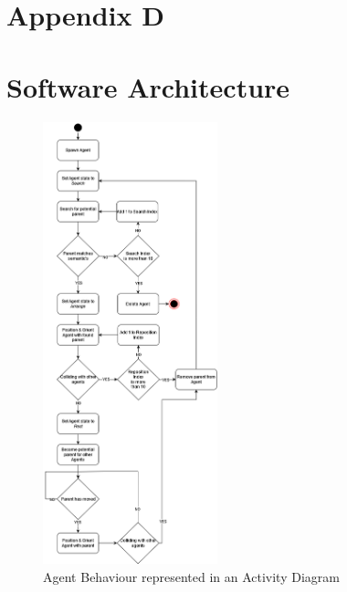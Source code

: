 \newpage
\section*{Appendix D}
\section*{Software Architecture}
\label{append:d}
\begin{figure}[ht]
    \includegraphics[width=0.45\textwidth]{./Images/AgentActivityDiagram.png}
    \centering
    \caption{Agent Behaviour represented in an Activity Diagram}
\end{figure}